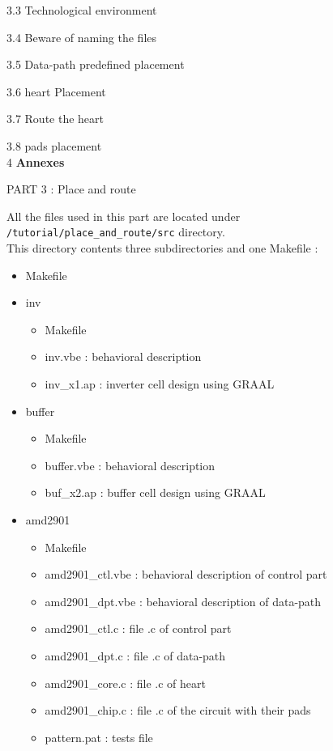 \documentclass[12pt]{article}
\begin{document}
{3.3} Technological environment

{3.4} Beware of naming the files

{3.5} Data-path predefined placement

{3.6} heart Placement

{3.7} Route the heart

{3.8} pads placement
\\
{4} {\bf Annexes} 
 
\newpage
       {\huge
        PART 3 : }
        \vspace{1cm}
        {\huge
        Place and route
        }
 
All the files used in this part are located under \\
\texttt{/tutorial/place\_and\_route/src} directory.\\
This directory contents three subdirectories and one Makefile :

\begin{itemize}\itemsep=-.8ex

\item   Makefile
\item   inv
    \begin{itemize}\itemsep=-.8ex
    \item   Makefile
    \item   inv.vbe    : behavioral description 
    \item   inv\_x1.ap : inverter cell design using GRAAL
    \end{itemize}
\item   buffer
    \begin{itemize}\itemsep=-.8ex
    \item   Makefile
    \item   buffer.vbe : behavioral description
    \item   buf\_x2.ap : buffer cell design using GRAAL
    \end{itemize}
\item  amd2901 
    \begin{itemize}\itemsep=-.8ex
    \item   Makefile
    \item   amd2901\_ctl.vbe : behavioral description of control
    part
    \item   amd2901\_dpt.vbe : behavioral description of data-path
    \item   amd2901\_ctl.c : file .c of control part
    \item   amd2901\_dpt.c : file .c of data-path
    \item   amd2901\_core.c : file .c of heart
    \item   amd2901\_chip.c : file .c of the circuit with their
    pads
    \item   pattern.pat : tests file
    \end{itemize}
\end{itemize}
\end{document}
